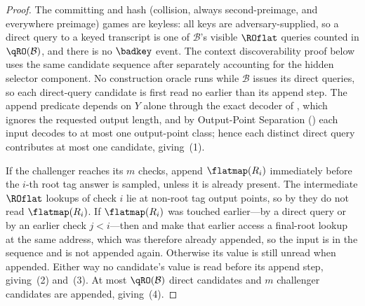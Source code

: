 \begin{proof}
The committing and hash (collision, always second-preimage, and everywhere
preimage) games are keyless: all keys are adversary-supplied, so a direct
query to a keyed transcript is one of
$\mathcal{B}$'s visible $\ROflat$ queries counted in $\qRO(\mathcal{B})$,
and there is no $\badkey$ event. The context discoverability proof below
uses the same candidate sequence after separately accounting for the
hidden selector component. No construction oracle runs while
$\mathcal{B}$ issues its direct queries, so each direct-query candidate is
first read no earlier than its append step. The append predicate depends
on $Y$ alone through the exact decoder of , which
ignores the requested output length, and by Output-Point Separation
() each input decodes to at most one output-point
class; hence each distinct direct query contributes at most one
candidate, giving~(1).

If the challenger reaches its $m$ checks, append $\flatmap(R_i)$
immediately before the $i$-th root tag answer is sampled, unless it is
already present. The intermediate $\ROflat$ lookups of check $i$ lie at
non-root tag output points, so by  they do not read
$\flatmap(R_i)$. If $\flatmap(R_i)$ was touched earlier---by a direct
query or by an earlier check $j < i$---then  and
 make that earlier access a final-root lookup at the
same address, which was therefore already appended, so the input is in
the sequence and is not appended again. Otherwise its value is still
unread when appended. Either way no candidate's value is read before its
append step, giving~(2) and~(3). At most $\qRO(\mathcal{B})$ direct
candidates and $m$ challenger candidates are appended, giving~(4).
\end{proof}

